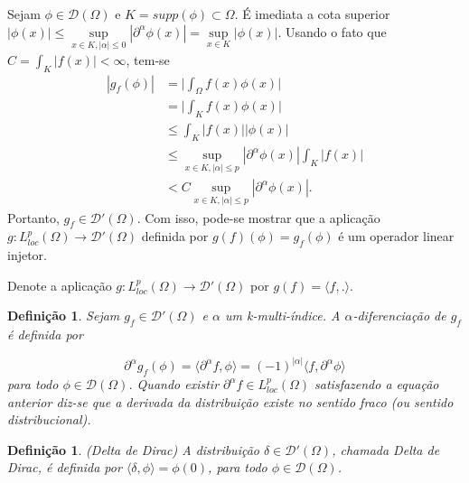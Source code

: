 \documentclass[12pt]{book}
\newtheorem{definicao}[teorema]{Definição}
\newcommand{\distribuicoes}{\distribuicoesgeral{\Omega}}
\newcommand{\distribuicoesgeral}[1]{\mathcal{D'}(#1)}
\newcommand{\espacoLpcomp}[1]{L^{p}_{loc}(#1)}
\newcommand{\funcoesteste}{\funcoestestegeral{\Omega}}
\newcommand{\funcoestestegeral}[1]{\mathcal{D}(#1)}
\newcommand{\produtointerno}[2]{\langle #1, #2 \rangle}
\begin{document}
	Sejam $\phi \in \funcoesteste$ e $K = supp(\phi) \subset \Omega$. É imediata a cota superior $|\phi(x)|\leq \sup\limits_{x\in K, |\alpha|\leq 0}|\partial^{\alpha}\phi(x)| = \sup\limits_{x\in K}|\phi(x)|$. Usando o fato que $C=\int_{K}|f(x)|<\infty$, tem-se
	$$
	\begin{aligned}
	|g_{f}(\phi)|
	&=\Big|\int_{\Omega}f(x)\phi(x)\Big|
	\\
	&=\Big|\int_{K}f(x)\phi(x)\Big|
	\\
	&\leq \int_{K}|f(x)||\phi(x)|
	\\
	&\leq \sup\limits_{x\in K, |\alpha|\leq p}|\partial^{\alpha}\phi(x)| \int_{K}|f(x)|
	\\
	&< C\sup\limits_{x\in K, |\alpha|\leq p}|\partial^{\alpha}\phi(x)|.
	\end{aligned}
	$$
	Portanto, $g_{f} \in \distribuicoes$. Com isso, pode-se mostrar que a aplicação $g:\espacoLpcomp{\Omega}\to \distribuicoesgeral{\Omega}$ definida por $g(f)(\phi) = g_{f}(\phi)$ é um operador linear injetor.
	
	Denote a aplicação $g:\espacoLpcomp{\Omega}\to \distribuicoesgeral{\Omega}$ por $g(f)=\produtointerno{f}{.}$.
	
	\begin{definicao}
		Sejam $g_{f}\in \distribuicoes$ e $\alpha$ um k-multi-índice. A $\alpha$-diferenciação de $g_{f}$ é definida por 
		
		$$
		\partial^{\alpha}g_{f}(\phi)=\produtointerno{\partial^{\alpha}f}{\phi}=(-1)^{|\alpha|}		\produtointerno{f}{\partial^{\alpha}\phi}		$$
		para todo $\phi \in \funcoesteste$. Quando existir $\partial^{\alpha}f \in \espacoLpcomp{\Omega}$ satisfazendo a equação anterior diz-se que a derivada da distribuição existe no sentido fraco (ou sentido distribucional).
	\end{definicao}
		
	 
	\begin{definicao}
		(Delta de Dirac) A distribuição $\delta \in \distribuicoes$, chamada Delta de Dirac, é definida por $\produtointerno{\delta}{\phi} = \phi(0)$, para todo $\phi \in \funcoesteste$.
	\end{definicao}
	
\end{document}

